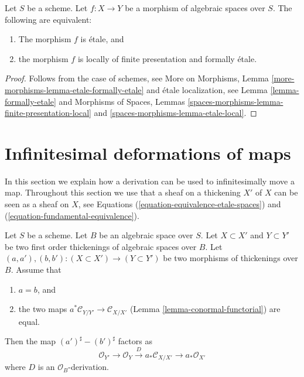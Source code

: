 \begin{lemma}
\label{lemma-etale-formally-etale}
Let $S$ be a scheme.
Let $f : X \to Y$ be a morphism of algebraic spaces over $S$.
The following are equivalent:
\begin{enumerate}
\item The morphism $f$ is \'etale, and
\item the morphism $f$ is locally of finite presentation and
formally \'etale.
\end{enumerate}
\end{lemma}

\begin{proof}
Follows from the case of schemes, see
More on Morphisms,
Lemma \ref{more-morphisms-lemma-etale-formally-etale}
and \'etale localization, see
Lemma \ref{lemma-formally-etale}
and
Morphisms of Spaces,
Lemmas \ref{spaces-morphisms-lemma-finite-presentation-local} and
\ref{spaces-morphisms-lemma-etale-local}.
\end{proof}















\section{Infinitesimal deformations of maps}
\label{section-action-by-derivations}

\noindent
In this section we explain how a derivation can be used to
infinitesimally move a map. Throughout this section we use that
a sheaf on a thickening $X'$ of $X$ can be seen as a sheaf on $X$, see
Equations (\ref{equation-equivalence-etale-spaces}) and
(\ref{equation-fundamental-equivalence}).

\begin{lemma}
\label{lemma-difference-derivation}
Let $S$ be a scheme. Let $B$ be an algebraic space over $S$.
Let $X \subset X'$ and $Y \subset Y'$ be two first order thickenings
of algebraic spaces over $B$.
Let $(a, a'), (b, b') : (X \subset X') \to (Y \subset Y')$
be two morphisms of thickenings over $B$. Assume that
\begin{enumerate}
\item $a = b$, and
\item the two maps $a^*\mathcal{C}_{Y/Y'} \to \mathcal{C}_{X/X'}$
(Lemma \ref{lemma-conormal-functorial})
are equal.
\end{enumerate}
Then the map $(a')^\sharp - (b')^\sharp$ factors as
$$
\mathcal{O}_{Y'} \to \mathcal{O}_Y \xrightarrow{D}
a_*\mathcal{C}_{X/X'} \to a_*\mathcal{O}_{X'}
$$
where $D$ is an $\mathcal{O}_B$-derivation.
\end{lemma}

